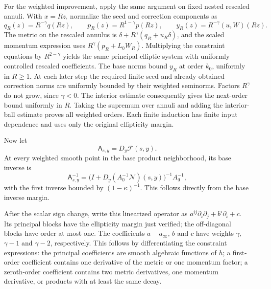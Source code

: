 \documentclass[
  english,
  11pt,
  reqno]{amsart}
\begin{document}
For the weighted improvement, apply the same argument on fixed nested
rescaled annuli. With \(x=Rz\), normalize the seed and correction
components as%
\begingroup{}\relax{} \[
q_R(z)=R^{-\gamma}q(Rz),\qquad
p_R(z)=R^{1-\gamma}p(Rz),\qquad
y_R(z)=R^{-\gamma}(u,W)(Rz).
\]\endgroup The metric on the rescaled annulus is
\(\delta+R^\gamma(q_R+u_R\delta)\), and the scaled momentum expression
uses \(R^\gamma(p_R+L_0W_R)\). Multiplying the constraint equations by
\(R^{2-\gamma}\) yields the same principal elliptic system with
uniformly controlled rescaled coefficients. The base norms bound \(y_R\)
at order \(k_0\), uniformly in \(R\ge1\). At each later step the
required finite seed and already obtained correction norms are uniformly
bounded by their weighted seminorms. Factors \(R^\gamma\) do not grow,
since \(\gamma<0\). The interior estimate consequently gives the
next-order bound uniformly in \(R\). Taking the supremum over annuli and
adding the interior-ball estimate proves all weighted orders. Each
finite induction has finite input dependence and uses only the original
ellipticity margin.

Now let \[
\mathsf A_{s,y}=D_y\mathcal F(s,y).
\] At every weighted smooth point in the base product neighborhood, its
base inverse is%
 \[
\mathsf A_{s,y}^{-1}
=\bigl(I+D_y(A_0^{-1}\mathcal N)(s,y)\bigr)^{-1}A_0^{-1},
\] with the first inverse bounded by \((1-\kappa)^{-1}\). This follows
directly from the base inverse margin.

After the scalar sign change, write this linearized operator as
\(a^{ij}\partial_i\partial_j+b^i\partial_i+c\). Its principal blocks
have the ellipticity margin just verified; the off-diagonal blocks have
order at most one. The coefficients \(a-a_\infty\), \(b\) and \(c\) have
weights \(\gamma\), \(\gamma-1\) and \(\gamma-2\), respectively. This
follows by differentiating the constraint expressions: the principal
coefficients are smooth algebraic functions of \(h\); a first-order
coefficient contains one derivative of the metric or one momentum
factor; a zeroth-order coefficient contains two metric derivatives, one
momentum derivative, or products with at least the same decay.
\end{document}
